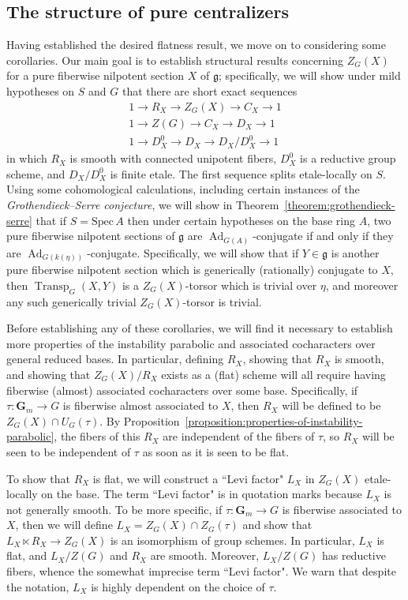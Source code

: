 \documentclass[11pt,reqno]{amsart}
\theoremstyle{definition}
\newcommand{\Spec}{\mathrm{Spec} \,}
\newcommand{\bG}{{\mathbf G}}
\newcommand{\fg}{\mathfrak{g}}
\DeclareMathOperator{\Ad}{Ad}
\DeclareMathOperator{\Transp}{Transp}
\begin{document}
\subsection{The structure of pure centralizers}

Having established the desired flatness result, we move on to considering some corollaries. Our main goal is to establish structural results concerning $Z_G(X)$ for a pure fiberwise nilpotent section $X$ of $\fg$; specifically, we will show under mild hypotheses on $S$ and $G$ that there are short exact sequences
\begin{gather*}
1 \to R_X \to Z_G(X) \to C_X \to 1 \\
1 \to Z(G) \to C_X \to D_X \to 1 \\
1 \to D_X^0 \to D_X \to D_X/D_X^0 \to 1
\end{gather*}
in which $R_X$ is smooth with connected unipotent fibers, $D_X^0$ is a reductive group scheme, and $D_X/D_X^0$ is finite etale. The first sequence splits etale-locally on $S$. Using some cohomological calculations, including certain instances of the \textit{Grothendieck--Serre conjecture}, we will show in Theorem~\ref{theorem:grothendieck-serre} that if $S = \Spec A$ then under certain hypotheses on the base ring $A$, two pure fiberwise nilpotent sections of $\fg$ are $\Ad_{G(A)}$-conjugate if and only if they are $\Ad_{G(k(\eta))}$-conjugate. Specifically, we will show that if $Y \in \fg$ is another pure fiberwise nilpotent section which is generically (rationally) conjugate to $X$, then $\Transp_G(X, Y)$ is a $Z_G(X)$-torsor which is trivial over $\eta$, and moreover any such generically trivial $Z_G(X)$-torsor is trivial. \smallskip

Before establishing any of these corollaries, we will find it necessary to establish more properties of the instability parabolic and associated cocharacters over general reduced bases. In particular, defining $R_X$, showing that $R_X$ is smooth, and showing that $Z_G(X)/R_X$ exists as a (flat) scheme will all require having fiberwise (almost) associated cocharacters over some base. Specifically, if $\tau: \bG_m \to G$ is fiberwise almost associated to $X$, then $R_X$ will be defined to be $Z_G(X) \cap U_G(\tau)$. By Proposition~\ref{proposition:properties-of-instability-parabolic}, the fibers of this $R_X$ are independent of the fibers of $\tau$, so $R_X$ will be seen to be independent of $\tau$ as soon as it is seen to be flat. \smallskip

To show that $R_X$ is flat, we will construct a ``Levi factor" $L_X$ in $Z_G(X)$ etale-locally on the base. The term ``Levi factor" is in quotation marks because $L_X$ is not generally smooth. To be more specific, if $\tau: \bG_m \to G$ is fiberwise associated to $X$, then we will define $L_X = Z_G(X) \cap Z_G(\tau)$ and show that $L_X \ltimes R_X \to Z_G(X)$ is an isomorphism of group schemes. In particular, $L_X$ is flat, and $L_X/Z(G)$ and $R_X$ are smooth. Moreover, $L_X/Z(G)$ has reductive fibers, whence the somewhat imprecise term ``Levi factor". We warn that despite the notation, $L_X$ is highly dependent on the choice of $\tau$. \smallskip
\end{document}
